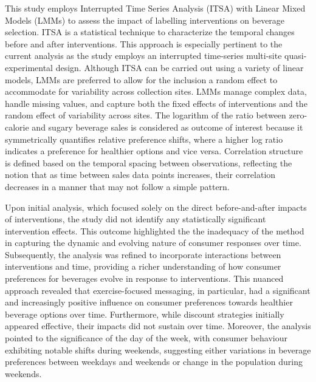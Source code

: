 \documentclass[
]{article}
\begin{document}
This study employs Interrupted Time Series Analysis (ITSA) with Linear Mixed Models (LMMs) to assess the impact of labelling interventions on beverage selection. ITSA is a statistical technique to characterize the temporal changes before and after interventions. This approach is especially pertinent to the current analysis as the study employs an interrupted time-series multi-site quasi-experimental design. Although ITSA can be carried out using a variety of linear models, LMMs are preferred to allow for the inclusion a random effect to accommodate for variability across collection sites. LMMs manage complex data, handle missing values, and capture both the fixed effects of interventions and the random effect of variability across sites. The logarithm of the ratio between zero-calorie and sugary beverage sales is considered as outcome of interest because it symmetrically quantifies relative preference shifts, where a higher log ratio indicates a preference for healthier options and vice versa. Correlation structure is defined based on the temporal spacing between observations, reflecting the notion that as time between sales data points increases, their correlation decreases in a manner that may not follow a simple pattern.

Upon initial analysis, which focused solely on the direct before-and-after impacts of interventions, the study did not identify any statistically significant intervention effects. This outcome highlighted the the inadequacy of the method in capturing the dynamic and evolving nature of consumer responses over time. Subsequently, the analysis was refined to incorporate interactions between interventions and time, providing a richer understanding of how consumer preferences for beverages evolve in response to interventions. This nuanced approach revealed that exercise-focused messaging, in particular, had a significant and increasingly positive influence on consumer preferences towards healthier beverage options over time. Furthermore, while discount strategies initially appeared effective, their impacts did not sustain over time. Moreover, the analysis pointed to the significance of the day of the week, with consumer behaviour exhibiting notable shifts during weekends, suggesting either variations in beverage preferences between weekdays and weekends or change in the population during weekends.
\end{document}
